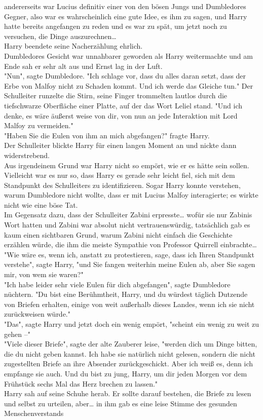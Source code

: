 {andererseits war Lucius definitiv einer von den bösen Jungs und Dumbledores Gegner, also war es wahrscheinlich eine gute Idee, es ihm zu sagen, und Harry hatte bereits angefangen zu reden und es war zu spät, um jetzt noch zu versuchen, die Dinge auszurechnen…\\ Harry beendete seine Nacherzählung ehrlich.\\ Dumbledores Gesicht war unnahbarer geworden als Harry weitermachte und am Ende sah er sehr alt aus und Ernst lag in der Luft.\\ "Nun", sagte Dumbledore. "Ich schlage vor, dass du alles daran setzt, dass der Erbe von Malfoy nicht zu Schaden kommt. Und ich werde das Gleiche tun." Der Schulleiter runzelte die Stirn, seine Finger trommelten lautlos durch die tiefschwarze Oberfläche einer Platte, auf der das Wort Leliel stand. "Und ich denke, es wäre äußerst weise von dir, von nun an jede Interaktion mit Lord Malfoy zu vermeiden."\\ "Haben Sie die Eulen von ihm an mich abgefangen?" fragte Harry.\\ Der Schulleiter blickte Harry für einen langen Moment an und nickte dann widerstrebend.\\ Aus irgendeinem Grund war Harry nicht so empört, wie er es hätte sein sollen. Vielleicht war es nur so, dass Harry es gerade sehr leicht fiel, sich mit dem Standpunkt des Schulleiters zu identifizieren. Sogar Harry konnte verstehen, warum Dumbledore nicht wollte, dass er mit Lucius Malfoy interagierte; es wirkte nicht wie eine böse Tat.\\ Im Gegensatz dazu, dass der Schulleiter Zabini erpresste… wofür sie nur Zabinis Wort hatten und Zabini war absolut nicht vertrauenswürdig, tatsächlich gab es kaum einen sichtbaren Grund, warum Zabini nicht einfach die Geschichte erzählen würde, die ihm die meiste Sympathie von Professor Quirrell einbrachte…\\ "Wie wäre es, wenn ich, anstatt zu protestieren, sage, dass ich Ihren Standpunkt verstehe", sagte Harry, "und Sie fangen weiterhin meine Eulen ab, aber Sie sagen mir, von wem sie waren?"\\ "Ich habe leider sehr viele Eulen für dich abgefangen", sagte Dumbledore nüchtern. "Du bist eine Berühmtheit, Harry, und du würdest täglich Dutzende von Briefen erhalten, einige von weit außerhalb dieses Landes, wenn ich sie nicht zurückweisen würde."\\ "Das", sagte Harry und jetzt doch ein wenig empört, "scheint ein wenig zu weit zu gehen --"\\ "Viele dieser Briefe", sagte der alte Zauberer leise, "werden dich um Dinge bitten, die du nicht geben kannst. Ich habe sie natürlich nicht gelesen, sondern die nicht zugestellten Briefe an ihre Absender zurückgeschickt. Aber ich weiß es, denn ich empfange sie auch. Und du bist zu jung, Harry, um dir jeden Morgen vor dem Frühstück sechs Mal das Herz brechen zu lassen."\\ Harry sah auf seine Schuhe herab. Er sollte darauf bestehen, die Briefe zu lesen und selbst zu urteilen, aber… in ihm gab es eine leise Stimme des gesunden Menschenverstands }
